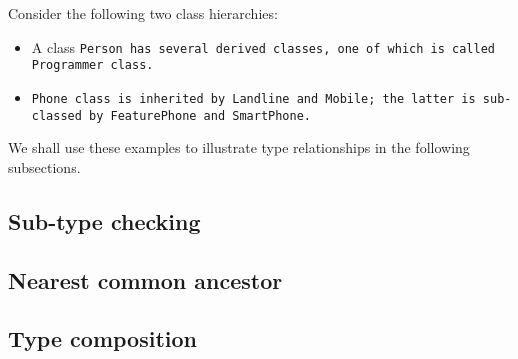 \def\Subsection#1{\subsection{#1}}

Consider the following two class hierarchies:

\begin{itemize}

\item A class \tt{Person} has several derived classes,
one of which is called \tt{Programmer} class.

\item \tt{Phone} class is inherited by \tt{Landline} and \tt{Mobile};
the latter is sub-classed by \tt{FeaturePhone} and \tt{SmartPhone}.

\end{itemize}

We shall use these examples to illustrate type
relationships in the following subsections.

\Subsection{Sub-type checking}

\Subsection{Nearest common ancestor}

\Subsection{Type composition}
